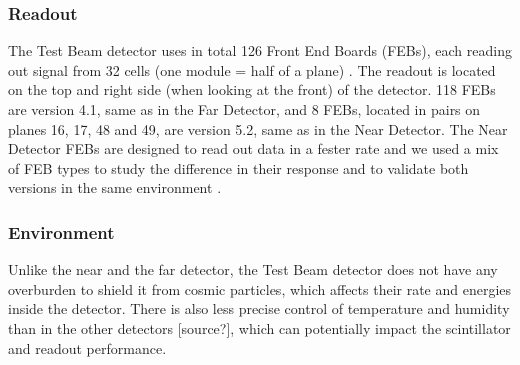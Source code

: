 \documentclass[12pt,a4paper]{article}
\begin{document}
\subsubsection*{Readout}
The Test Beam detector uses in total 126 Front End Boards (FEBs), each reading out signal from 32 cells (one module = half of a plane) \cite{NOVA-doc-29543}. The readout is located on the top and right side (when looking at the front) of the detector. 118 FEBs are version 4.1, same as in the Far Detector, and 8 FEBs, located in pairs on planes 16, 17, 48 and 49, are version 5.2, same as in the Near Detector. The Near Detector FEBs are designed to read out data in a fester rate and we used a mix of FEB types to study the difference in their response and to validate both versions in the same environment \cite{TeresaThesis}.


\subsubsection*{Environment}
Unlike the near and the far detector, the Test Beam detector does not have any overburden to shield it from cosmic particles, which affects their rate and energies inside the detector. There is also less precise control of temperature and humidity than in the other detectors [source?], which can potentially impact the scintillator and readout performance.




\end{document}
